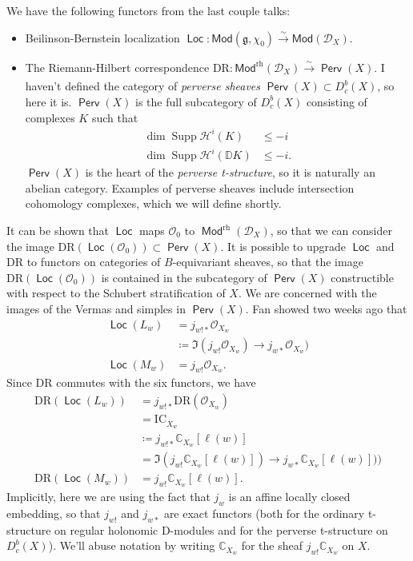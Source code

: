 \documentclass[leqno, openany]{memoir}
\theoremstyle{definition}
\theoremstyle{remark}
\theoremstyle{plain}
\theoremstyle{definition}
\theoremstyle{remark}
\newcommand{\mc}[1]{\mathcal{#1}}
\newcommand{\mr}[1]{\mathrm{#1}}
\newcommand{\ms}[1]{\mathsf{#1}}
\DeclareMathOperator{\Supp}{Supp}
\DeclareMathOperator{\Loc}{\ms{Loc}}
\DeclareMathOperator{\Perv}{\ms{Perv}}
\DeclareMathOperator{\Mod}{\ms{Mod}}
\begin{document}
We have the following functors from the last couple talks: \begin{itemize}
\item Beilinson-Bernstein localization $\Loc: \ms{Mod}(\mathfrak{g},\chi_0) \xrightarrow[]{\sim} \ms{Mod}(\mc{D}_X)$.

\item The Riemann-Hilbert correspondence $\mr{DR}: \ms{Mod}^{\mr{rh}}(\mc{D}_X) \xrightarrow[]{\sim} \Perv(X)$. I haven't defined the category of \textit{perverse sheaves} $\Perv(X) \subset D_c^b(X)$, so here it is. $\Perv(X)$ is the full subcategory of $D_c^b(X)$ consisting of complexes $K$ such that \begin{align*}
\dim\Supp\mathcal{H}^i(K) &\le -i \\
\dim\Supp\mathcal{H}^i(\mathbb{D}K) &\le -i.
\end{align*}
$\Perv(X)$ is the heart of the \textit{perverse t-structure}, so it is naturally an abelian category. Examples of perverse sheaves include intersection cohomology complexes, which we will define shortly.

\end{itemize}

It can be shown that $\Loc$ maps $\mathcal{O}_0$ to $\Mod^{\mr{rh}}(\mc{D}_X)$, so that we can consider the image $\mr{DR}(\Loc(\mathcal{O}_0)) \subset \Perv(X)$. It is possible to upgrade $\Loc$ and $\mr{DR}$ to functors on categories of $B$-equivariant sheaves, so that the image $\mr{DR}(\Loc(\mathcal{O}_0))$ is contained in the subcategory of $\Perv(X)$ constructible with respect to the Schubert stratification of $X$. We are concerned with the images of the Vermas and simples in $\Perv(X)$. Fan showed two weeks ago that \begin{align*}
\Loc(L_w) &= j_{w!*}\mathcal{O}_{X_w} \\
&\coloneqq \Im(j_{w!}\mathcal{O}_{X_w}) \to j_{w*}\mathcal{O}_{X_w}) \\
\Loc(M_w) &= j_{w!}\mathcal{O}_{X_w}.
\end{align*}
Since $\mr{DR}$ commutes with the six functors, we have \begin{align*}
\mr{DR}(\Loc(L_w)) &= j_{w!*}\mr{DR}(\mathcal{O}_{X_w}) \\
&= \mr{IC}_{\overline{X}_w} \\
&\coloneqq j_{w!*}\mathbb{C}_{X_w}[\ell(w)] \\
&= \Im(j_{w!}\mathbb{C}_{X_w}[\ell(w)]) \to j_{w*}\mathbb{C}_{X_w}[\ell(w)])) \\
\mr{DR}(\Loc(M_w)) &= j_{w!}\mathbb{C}_{X_w}[\ell(w)].
\end{align*}
Implicitly, here we are using the fact that $j_w$ is an affine locally closed embedding, so that $j_{w!}$ and $j_{w*}$ are exact functors (both for the ordinary t-structure on regular holonomic D-modules and for the perverse t-structure on $D_c^b(X)$). We'll abuse notation by writing $\mathbb{C}_{X_w}$ for the sheaf $j_{w!}\mathbb{C}_{X_w}$ on $X$.
\end{document}
